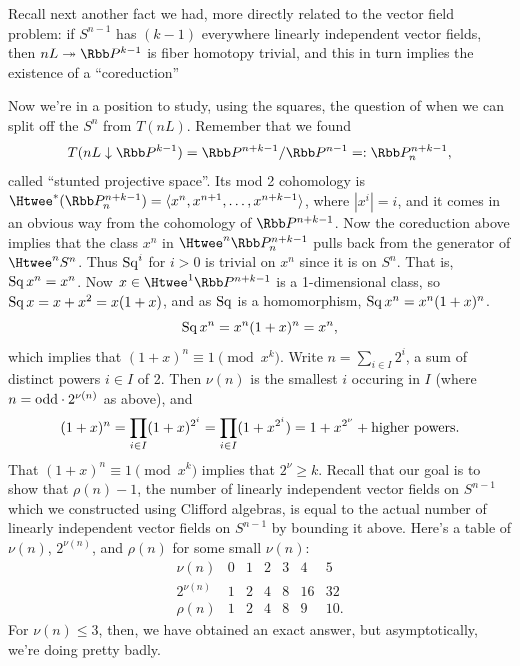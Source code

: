 Recall next another fact we had, more directly related to the vector field problem: if $S^{n-1}$ has $(k-1)$ everywhere linearly independent vector fields, then $nL \onto \RP^{k-1}$ is fiber homotopy trivial, and this in turn implies the existence of a ``coreduction''
Now we're in a position to study, using the squares, the question of when we can split off the $S^n$ from $T(nL)$.  Remember that we found
\[
T(nL\downarrow\RP^{k-1}) = \RP^{n+k-1}/\RP^{n-1} =: \RP^{n+k-1}_n
,\]
called ``stunted projective space''.  Its mod 2 cohomology is $\Htwee^*(\RP^{n+k-1}_n) = \langle x^n, x^{n+1}, \ldots, x^{n+k-1} \rangle$, where $|x^i| = i$, and it comes in an obvious way from the cohomology of $\RP^{n+k-1}$.  Now the coreduction above implies that the class $x^n$ in $\Htwee^n \RP^{n+k-1}_n$ pulls back from the generator of $\Htwee^n S^n$.  Thus $\operatorname{Sq}^i$ for $i > 0$ is trivial on $x^n$ since it is on $S^n$. That is, $\operatorname{Sq} x^n=x^n$.  Now $x \in \Htwee^1 \RP^{n+k-1}$ is a 1-dimensional class, so $\operatorname{Sq} x = x + x^2 = x(1+x)$, and as $\operatorname{Sq}$ is a homomorphism, $\operatorname{Sq} x^n = x^n(1+x)^n$. %
\[
\operatorname{Sq} x^n = x^n(1 + x)^n = x^n
,\]
which implies that $(1+x)^n \equiv 1 \pmod{x^k}$.  Write $n = \sum_{i \in I} 2^i$, a sum of distinct powers $i \in I$ of 2.  Then $\nu(n)$ is the smallest $i$ occuring in $I$ (where $n=\textup{odd}\cdot2^{\nu(n)}$ as above), and
\[
(1+x)^n = \prod_{i \in I} (1 + x)^{2^i} = \prod_{i \in I} (1 + x^{2^i}) = 1 + x^{2^\nu} + \hbox{higher powers}
.\]
That $(1 + x)^n \equiv 1 \pmod{x^k}$ implies that $2^\nu \ge k$.  Recall that our goal is to show that $\rho(n) - 1$, the number of linearly independent vector fields on $S^{n-1}$ which we constructed using Clifford algebras, is equal to the actual number of linearly independent vector fields on $S^{n-1}$ by bounding it above.  Here's a table of $\nu(n)$, $2^{\nu(n)}$, and $\rho(n)$ for some small $\nu(n)$:
\[
\begin{array}{c|cccccc}
\nu(n) & 0 & 1 & 2 & 3 & 4 & 5 \\
\hline
2^{\nu(n)} & 1 & 2 & 4 & 8 & 16 & 32 \\
\hline
\rho(n) & 1 & 2 & 4 & 8 & 9 & 10.
\end{array}
\]
For $\nu(n) \le 3$, then, we have obtained an exact answer, but asymptotically, we're doing pretty badly.

